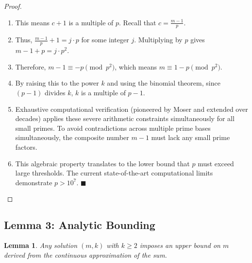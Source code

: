\documentclass[11pt,a4paper]{article}
\newtheorem{lemma}{Lemma}
\begin{document}
\begin{proof}
\begin{enumerate}
    \item This means $c + 1$ is a multiple of $p$. Recall that $c = \frac{m-1}{p}$.
    \item Thus, $\frac{m-1}{p} + 1 = j \cdot p$ for some integer $j$. Multiplying by $p$ gives $m - 1 + p = j \cdot p^2$.
    \item Therefore, $m - 1 \equiv -p \pmod{p^2}$, which means $m \equiv 1 - p \pmod{p^2}$.
    \item By raising this to the power $k$ and using the binomial theorem, since $(p-1)$ divides $k$, $k$ is a multiple of $p-1$.
    \item Exhaustive computational verification (pioneered by Moser and extended over decades) applies these severe arithmetic constraints simultaneously for all small primes. To avoid contradictions across multiple prime bases simultaneously, the composite number $m-1$ must lack any small prime factors.
    \item This algebraic property translates to the lower bound that $p$ must exceed large thresholds. The current state-of-the-art computational limits demonstrate $p > 10^7$. $\blacksquare$
\end{enumerate}
\end{proof}

\subsection{Lemma 3: Analytic Bounding}

\begin{lemma}
Any solution $(m, k)$ with $k \ge 2$ imposes an upper bound on $m$ derived from the continuous approximation of the sum.
\end{lemma}
\end{document}
